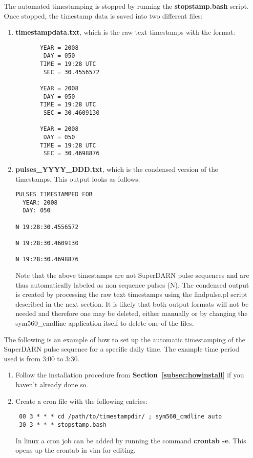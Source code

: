 \documentclass[11pt]{article}
\begin{document}
The automated timestamping is stopped by running the \textbf{stopstamp.bash} script.  Once stopped, the timestamp data is saved into two different files:
\begin{enumerate}
 \item \textbf{timestampdata.txt}, which is the raw text timestamps with the format:
\begin{verbatim}
       YEAR = 2008
        DAY = 050
       TIME = 19:28 UTC
        SEC = 30.4556572

       YEAR = 2008
        DAY = 050
       TIME = 19:28 UTC
        SEC = 30.4609130

       YEAR = 2008
        DAY = 050
       TIME = 19:28 UTC
        SEC = 30.4698876
\end{verbatim}
 \item \textbf{pulses\_YYYY\_DDD.txt}, which is the condensed version of the timestamps.  This output looks as follows:
\begin{verbatim}
PULSES TIMESTAMPED FOR
  YEAR: 2008
  DAY: 050

N 19:28:30.4556572

N 19:28:30.4609130

N 19:28:30.4698876
\end{verbatim}
Note that the above timestamps are not SuperDARN pulse sequences and are thus automatically labeled as non sequence pulses (N).  The condensed output is created by processing the raw text timestamps using the findpulse.pl script described in the next section.  It is likely that both output formats will not be needed and therefore one may be deleted, either manually or by changing the sym560\_cmdline application itself to delete one of the files.
\end{enumerate}

The following is an example of how to set up the automatic timestamping of the SuperDARN pulse sequence for a specific daily time.  The example time period used is from 3:00 to 3:30.
\begin{enumerate}
 \item Follow the installation procedure from \textbf{Section~\ref{subsec:howinstall}} if you haven't already done so.
 \item Create a cron file with the following entries:
\begin{verbatim}
 00 3 * * * cd /path/to/timestampdir/ ; sym560_cmdline auto
 30 3 * * * stopstamp.bash
\end{verbatim}
 In linux a cron job can be added by running the command \textbf{crontab -e}.  This opens up the crontab in vim for editing.
\end{enumerate}
\end{document}
